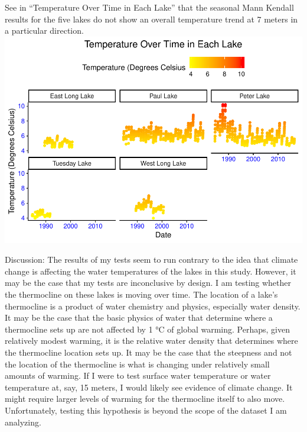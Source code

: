 \documentclass[12pt,]{article}
\begin{document}
See in ``Temperature Over Time in Each Lake'' that the seasonal Mann
Kendall results for the five lakes do not show an overall temperature
trend at 7 meters in a particular direction.
\includegraphics{KeithBollt_ENV872_FinalProject_files/figure-latex/smk temperature visualization-1.pdf}

Discussion: The results of my tests seem to run contrary to the idea
that climate change is affecting the water temperatures of the lakes in
this study. However, it may be the case that my tests are inconclusive
by design. I am testing whether the thermocline on these lakes is moving
over time. The location of a lake's thermocline is a product of water
chemistry and physics, especially water density. It may be the case that
the basic physics of water that determine where a thermocline sets up
are not affected by 1 °C of global warming. Perhaps, given relatively
modest warming, it is the relative water density that determines where
the thermocline location sets up. It may be the case that the steepness
and not the location of the thermocline is what is changing under
relatively small amounts of warming. If I were to test surface water
temperature or water temperature at, say, 15 meters, I would likely see
evidence of climate change. It might require larger levels of warming
for the thermocline itself to also move. Unfortunately, testing this
hypothesis is beyond the scope of the dataset I am analyzing.
\end{document}

